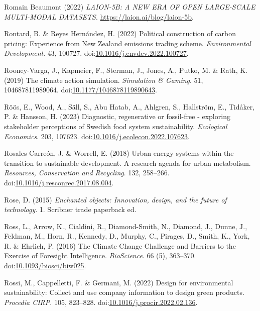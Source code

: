 \documentclass[
  letterpaper,
  DIV=11,
  numbers=noendperiod]{scrartcl}
\newlength{\cslhangindent}
\newenvironment{CSLReferences}[2] %
 {\begin{list}{}{%
  \setlength{\itemindent}{0pt}
  \setlength{\leftmargin}{0pt}
  \setlength{\parsep}{0pt}
  \ifodd #1
   \setlength{\leftmargin}{\cslhangindent}
   \setlength{\itemindent}{-1\cslhangindent}
  \fi
  \setlength{\itemsep}{#2\baselineskip}}}
 {\end{list}}
\begin{document}
\begin{CSLReferences}{0}{1}
Romain Beaumont (2022) \emph{{LAION-5B}: {A NEW ERA OF OPEN LARGE-SCALE
MULTI-MODAL DATASETS}}. \url{https://laion.ai/blog/laion-5b}.

Rontard, B. \& Reyes Hernández, H. (2022) Political construction of
carbon pricing: {Experience} from {New Zealand} emissions trading
scheme. \emph{Environmental Development}. 43, 100727.
doi:\href{https://doi.org/10.1016/j.envdev.2022.100727}{10.1016/j.envdev.2022.100727}.

Rooney-Varga, J., Kapmeier, F., Sterman, J., Jones, A., Putko, M. \&
Rath, K. (2019) The climate action simulation. \emph{Simulation \&
Gaming}. 51, 104687811989064.
doi:\href{https://doi.org/10.1177/1046878119890643}{10.1177/1046878119890643}.

Röös, E., Wood, A., Säll, S., Abu Hatab, A., Ahlgren, S., Hallström, E.,
Tidåker, P. \& Hansson, H. (2023) Diagnostic, regenerative or
fossil-free - exploring stakeholder perceptions of {Swedish} food system
sustainability. \emph{Ecological Economics}. 203, 107623.
doi:\href{https://doi.org/10.1016/j.ecolecon.2022.107623}{10.1016/j.ecolecon.2022.107623}.

Rosales Carreón, J. \& Worrell, E. (2018) Urban energy systems within
the transition to sustainable development. {A} research agenda for urban
metabolism. \emph{Resources, Conservation and Recycling}. 132, 258--266.
doi:\href{https://doi.org/10.1016/j.resconrec.2017.08.004}{10.1016/j.resconrec.2017.08.004}.

Rose, D. (2015) \emph{Enchanted objects: Innovation, design, and the
future of technology}. 1. Scribner trade paperback ed.

Ross, L., Arrow, K., Cialdini, R., Diamond-Smith, N., Diamond, J.,
Dunne, J., Feldman, M., Horn, R., Kennedy, D., Murphy, C., Pirages, D.,
Smith, K., York, R. \& Ehrlich, P. (2016) The {Climate Change Challenge}
and {Barriers} to the {Exercise} of {Foresight Intelligence}.
\emph{BioScience}. 66 (5), 363--370.
doi:\href{https://doi.org/10.1093/biosci/biw025}{10.1093/biosci/biw025}.

Rossi, M., Cappelletti, F. \& Germani, M. (2022) Design for
environmental sustainability: Collect and use company information to
design green products. \emph{Procedia CIRP}. 105, 823--828.
doi:\href{https://doi.org/10.1016/j.procir.2022.02.136}{10.1016/j.procir.2022.02.136}.


\end{CSLReferences}
\end{document}
